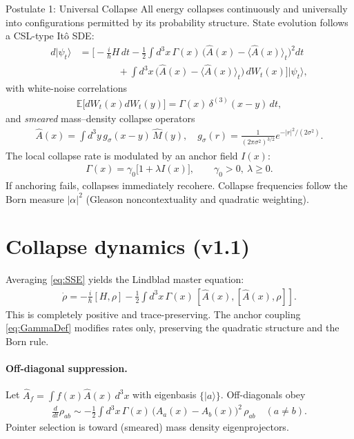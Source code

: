 \documentclass[11pt]{article}
\newcommand{\braket}[1]{\langle #1 \rangle}
\newcommand{\ket}[1]{| #1 \rangle}
\begin{document}
\begin{postulate}{Postulate 1: Universal Collapse}
    All energy collapses continuously and universally into configurations permitted by its probability structure. State evolution follows a CSL-type It\^o SDE:
    \begin{align}
    d|\psi_t\rangle&=\Big[-\tfrac{i}{\hbar}H\,dt-\tfrac12\!\int\!d^3x\,\Gamma(x)\,\big(\hat A(x)-\braket{\hat A(x)}_t\big)^2dt \nonumber\\
    &\qquad\qquad+\!\int\!d^3x\,\big(\hat A(x)-\braket{\hat A(x)}_t\big)\,dW_t(x)\Big]|\psi_t\rangle, \label{eq:SSE}
    \end{align}
    with white-noise correlations
    \begin{align}
    \mathbb E\big[dW_t(x)dW_t(y)\big]=\Gamma(x)\,\delta^{(3)}(x-y)\,dt,
    \end{align}
    and \emph{smeared} mass--density collapse operators
    \begin{align}
    \hat A(x)=\!\int\!d^3y\,g_\sigma(x-y)\,\hat M(y),\quad
    g_\sigma(r)=\frac{1}{(2\pi\sigma^2)^{3/2}}e^{-|r|^2/(2\sigma^2)}.
    \end{align}
    The local collapse rate is modulated by an anchor field $I(x)$:
    \begin{align}
    \Gamma(x)=\gamma_0\big[1+\lambda I(x)\big],\qquad \gamma_0>0,\ \lambda\ge 0. \label{eq:GammaDef}
    \end{align}
    If anchoring fails, collapses immediately recohere. Collapse frequencies follow the Born measure $|\alpha|^2$ (Gleason noncontextuality and quadratic weighting).
\end{postulate}

\section{Collapse dynamics (v1.1)}\label{sec:collapse}
Averaging \eqref{eq:SSE} yields the Lindblad master equation:
\begin{align}
\dot\rho=-\frac{i}{\hbar}[H,\rho]-\frac12\!\int\!d^3x\,\Gamma(x)\,[\hat A(x),[\hat A(x),\rho]]. \label{eq:Master}
\end{align}
This is completely positive and trace-preserving. The anchor coupling \eqref{eq:GammaDef} modifies rates only, preserving the quadratic structure and the Born rule.

\paragraph{Off-diagonal suppression.}
Let $\hat A_f=\int f(x)\hat A(x)\,d^3x$ with eigenbasis $\{\ket{a}\}$. Off-diagonals obey
\begin{align}
\frac{d}{dt}\rho_{ab}\sim -\frac12\!\int\!d^3x\,\Gamma(x)\,\big(A_a(x)-A_b(x)\big)^2\,\rho_{ab}\quad (a\neq b).
\end{align}
Pointer selection is toward (smeared) mass density eigenprojectors.
\end{document}
